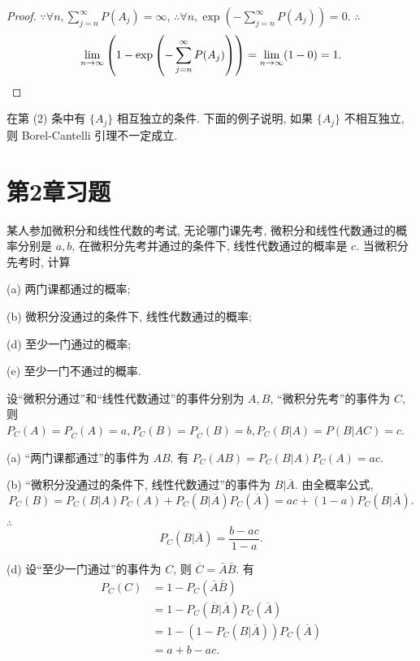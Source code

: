 \documentclass{ctexart}
\begin{document}
\begin{proof}
    $\because\forall n,\sum\limits_{j=n}^\infty P(A_j)=\infty$, $\therefore\forall n,\exp\left(-\sum\limits_{j=n}^\infty P(A_j)\right)=0$. $\therefore$
    \[\lim\limits_{n\to\infty}\left(1-\exp\left(-\sum\limits_{j=n}^\infty P(A_j)\right)\right)=\lim\limits_{n\to\infty}(1-0)=1.\qedhere\]
\end{proof}
在第 (2) 条中有 $\{A_j\}$ 相互独立的条件. 下面的例子说明, 如果 $\{A_j\}$ 不相互独立, 则 Borel-Cantelli 引理不一定成立.

\section{第2章习题}
\addtocounter{exsection}{2}
\addtocounter{exercise}{9}
\begin{exercise}%
    某人参加微积分和线性代数的考试, 无论哪门课先考, 微积分和线性代数通过的概率分别是 $a,b$, 在微积分先考并通过的条件下, 线性代数通过的概率是 $c$. 当微积分先考时, 计算

    (a) 两门课都通过的概率;

    (b) 微积分没通过的条件下, 线性代数通过的概率;

    (d) 至少一门通过的概率;

    (e) 至少一门不通过的概率.
\end{exercise}
\begin{solution}
    设``微积分通过''和``线性代数通过''的事件分别为 $A,B$, ``微积分先考''的事件为 $C$, 则 $P_C(A)=P_{\overline{C}}(A)=a,P_C(B)=P_{\overline{C}}(B)=b,P_C(B|A)=P(B|AC)=c$.

    (a) ``两门课都通过''的事件为 $AB$. 有 $P_C(AB)=P_C(B|A)P_C(A)=ac$.

    (b) ``微积分没通过的条件下, 线性代数通过''的事件为 $B|\overline{A}$. 由全概率公式,
    \[P_C(B)=P_C(B|A)P_C(A)+P_C(B|\overline{A})P_C(\overline{A})=ac+(1-a)P_C(B|\overline{A}).\]

    $\therefore$
    \[P_C(B|\overline{A})=\dfrac{b-ac}{1-a}.\]

    (d) 设``至少一门通过''的事件为 $C$, 则 $\overline{C}=\bar{A}\bar{B}$. 有
    \begin{align*}
        P_C(C) & =1-P_C(\bar{A}\bar{B}) \\
        & =1-P_C(\overline{B}|\overline{A})P_C(\overline{A}) \\
        & =1-(1-P_C(B|\overline{A}))P_C(\overline{A}) \\
        & =a+b-ac.
    \end{align*}
\end{solution}
\end{document}
